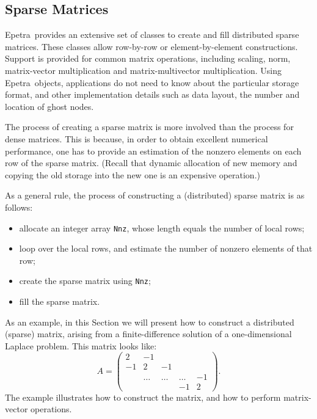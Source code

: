 \documentclass[10pt,relax]{SANDreport}
\newcommand{\epetra}{{Epetra}}
\begin{document}
\subsection{Sparse Matrices}
\label{sec:matrices}

\epetra\ provides an extensive set of classes to create and fill
distributed sparse matrices. These classes allow row-by-row or
element-by-element constructions. Support is provided for common matrix
operations, including scaling, norm, matrix-vector multiplication and
matrix-multivector multiplication.
Using \epetra\ objects, applications do not need to know about the
particular storage format, and other implementation details such as data
layout, the number and location of ghost nodes. 

The process of creating a sparse matrix is more involved than the
process for dense matrices. This is because, in order to obtain
excellent numerical performance, one has to provide an estimation of
the nonzero elements on each row of the sparse matrix. (Recall that
dynamic allocation of new memory and copying the old storage into the
new one is an expensive operation.)

As a general rule, the process of constructing a (distributed) sparse
matrix is as follows:
\begin{itemize}
\item allocate an integer array \verb!Nnz!, whose length equals the
  number of local rows;
\item loop over the local rows, and estimate the number of nonzero
  elements of that row;
\item create the sparse matrix using \verb!Nnz!;
\item fill the sparse matrix.
\end{itemize}

As an example, in this Section we will present how to construct a
distributed (sparse) matrix, arising from a finite-difference solution
of a one-dimensional Laplace problem. This matrix looks like:
\begin{equation*}
A = \begin{pmatrix}
 2 & -1 &     &   &    \\
-1 &  2     & -1     &        &    \\
   & \ldots & \ldots & \ldots & -1 \\
   &        &        & -1     & 2
\end{pmatrix}.
\end{equation*}
The example illustrates how to construct the matrix,
and how to perform matrix-vector operations.
\end{document}
